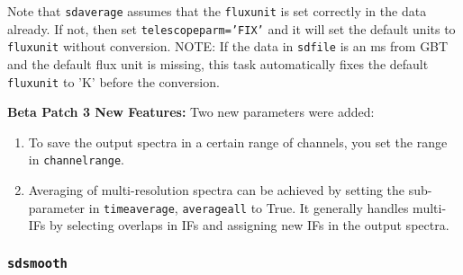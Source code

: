   Note that {\tt sdaverage} assumes that the {\tt fluxunit} is set correctly in
  the data already.  If not, then set {\tt telescopeparm='FIX'} and it
  will set the default units to {\tt fluxunit} without conversion.
  NOTE: If the data in {\tt sdfile} is an ms from GBT and the default flux
  unit is missing, this task automatically fixes the default {\tt fluxunit}
  to 'K' before the conversion.

  {\bf Beta Patch 3 New Features:}
  Two new parameters were added: 
  \begin{enumerate}
  \item To save the output spectra in a certain range of 
  channels, you set the range in {\tt channelrange}.
  \item Averaging of multi-resolution
  spectra can be achieved by setting the sub-parameter in {\tt timeaverage}, {\tt averageall} 
  to True. It generally handles multi-IFs by selecting overlaps in IFs and assigning
  new IFs in the output spectra.
  \end{enumerate}
  
\subsubsection{{\tt sdsmooth}}
\label{section:sd.sdtasks.tasks.sdsmooth}

